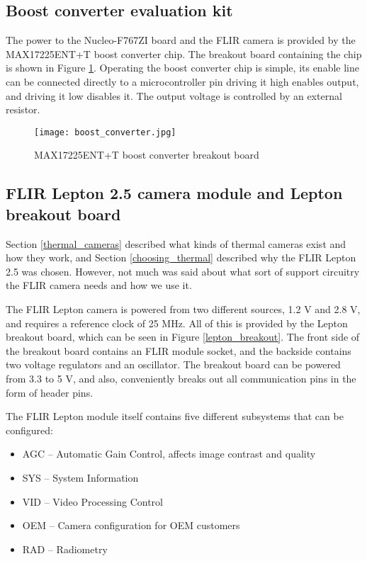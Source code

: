 \subsection{ Boost converter evaluation kit}

The power to the Nucleo-F767ZI board and the FLIR camera is provided by the MAX17225ENT+T boost converter chip.
The breakout board containing the chip is shown in Figure \ref{boost_converter}.
Operating the boost converter chip is simple, its enable line can be connected directly to a microcontroller pin driving it high enables output, and driving it low disables it.
The output voltage is controlled by an external resistor.

\begin{figure}[ht]
        \centering
        \texttt{[image: boost\_converter.jpg]} 
        \caption{ MAX17225ENT+T boost converter breakout board}
        \label{boost_converter}
\end{figure}

\subsection{ FLIR Lepton 2.5 camera module and Lepton breakout board}

Section \ref{thermal_cameras} described what kinds of thermal cameras exist and how they work, and Section \ref{choosing_thermal} described why the FLIR Lepton 2.5 was chosen.
However, not much was said about what sort of support circuitry the FLIR camera needs and how we use it.

The FLIR Lepton camera is powered from two different sources, 1.2 \si{\volt} and 2.8 \si{\volt}, and requires a reference clock of 25 \si{\mega\hertz}.
All of this is provided by the Lepton breakout board, which can be seen in Figure \ref{lepton_breakout}.
The front side of the breakout board contains an FLIR module socket, and the backside contains two voltage regulators and an oscillator.
The breakout board can be powered from 3.3 to 5 \si{\volt}, and also, conveniently breaks out all communication pins in the form of header pins.

The FLIR Lepton module itself contains five different subsystems that can be configured:

\begin{itemize}
    \item AGC – Automatic Gain Control, affects image contrast and quality
    \item SYS – System Information
    \item VID – Video Processing Control
    \item OEM – Camera configuration for OEM customers
    \item RAD – Radiometry
\end{itemize}

